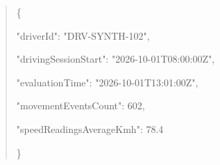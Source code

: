 \begin{quote}\ttfamily
  \{\allowbreak{}\par
    "\allowbreak{}d\allowbreak{}r\allowbreak{}i\allowbreak{}v\allowbreak{}e\allowbreak{}r\allowbreak{}I\allowbreak{}d\allowbreak{}"\allowbreak{}:\allowbreak{} "\allowbreak{}D\allowbreak{}R\allowbreak{}V\allowbreak{}-\allowbreak{}S\allowbreak{}Y\allowbreak{}N\allowbreak{}T\allowbreak{}H\allowbreak{}-\allowbreak{}1\allowbreak{}0\allowbreak{}2\allowbreak{}"\allowbreak{},\allowbreak{}\par
    "\allowbreak{}d\allowbreak{}r\allowbreak{}i\allowbreak{}v\allowbreak{}i\allowbreak{}n\allowbreak{}g\allowbreak{}S\allowbreak{}e\allowbreak{}s\allowbreak{}s\allowbreak{}i\allowbreak{}o\allowbreak{}n\allowbreak{}S\allowbreak{}t\allowbreak{}a\allowbreak{}r\allowbreak{}t\allowbreak{}"\allowbreak{}:\allowbreak{} "\allowbreak{}2\allowbreak{}0\allowbreak{}2\allowbreak{}6\allowbreak{}-\allowbreak{}1\allowbreak{}0\allowbreak{}-\allowbreak{}0\allowbreak{}1\allowbreak{}T\allowbreak{}0\allowbreak{}8\allowbreak{}:\allowbreak{}0\allowbreak{}0\allowbreak{}:\allowbreak{}0\allowbreak{}0\allowbreak{}Z\allowbreak{}"\allowbreak{},\allowbreak{}\par
    "\allowbreak{}e\allowbreak{}v\allowbreak{}a\allowbreak{}l\allowbreak{}u\allowbreak{}a\allowbreak{}t\allowbreak{}i\allowbreak{}o\allowbreak{}n\allowbreak{}T\allowbreak{}i\allowbreak{}m\allowbreak{}e\allowbreak{}"\allowbreak{}:\allowbreak{} "\allowbreak{}2\allowbreak{}0\allowbreak{}2\allowbreak{}6\allowbreak{}-\allowbreak{}1\allowbreak{}0\allowbreak{}-\allowbreak{}0\allowbreak{}1\allowbreak{}T\allowbreak{}1\allowbreak{}3\allowbreak{}:\allowbreak{}0\allowbreak{}1\allowbreak{}:\allowbreak{}0\allowbreak{}0\allowbreak{}Z\allowbreak{}"\allowbreak{},\allowbreak{}\par
    "\allowbreak{}m\allowbreak{}o\allowbreak{}v\allowbreak{}e\allowbreak{}m\allowbreak{}e\allowbreak{}n\allowbreak{}t\allowbreak{}E\allowbreak{}v\allowbreak{}e\allowbreak{}n\allowbreak{}t\allowbreak{}s\allowbreak{}C\allowbreak{}o\allowbreak{}u\allowbreak{}n\allowbreak{}t\allowbreak{}"\allowbreak{}:\allowbreak{} 6\allowbreak{}0\allowbreak{}2\allowbreak{},\allowbreak{}\par
    "\allowbreak{}s\allowbreak{}p\allowbreak{}e\allowbreak{}e\allowbreak{}d\allowbreak{}R\allowbreak{}e\allowbreak{}a\allowbreak{}d\allowbreak{}i\allowbreak{}n\allowbreak{}g\allowbreak{}s\allowbreak{}A\allowbreak{}v\allowbreak{}e\allowbreak{}r\allowbreak{}a\allowbreak{}g\allowbreak{}e\allowbreak{}K\allowbreak{}m\allowbreak{}h\allowbreak{}"\allowbreak{}:\allowbreak{} 7\allowbreak{}8\allowbreak{}.\allowbreak{}4\allowbreak{}\par
  \}\allowbreak{}\par
\end{quote}
